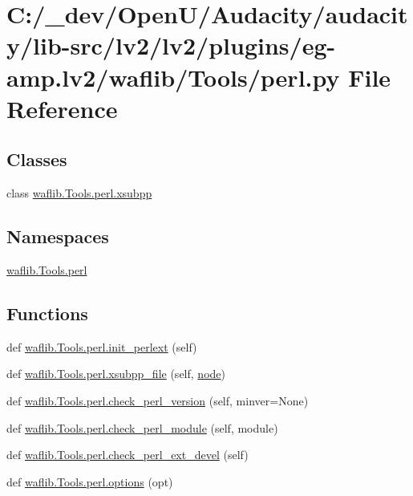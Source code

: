 \hypertarget{lv2_2plugins_2eg-amp_8lv2_2waflib_2_tools_2perl_8py}{}\section{C\+:/\+\_\+dev/\+Open\+U/\+Audacity/audacity/lib-\/src/lv2/lv2/plugins/eg-\/amp.lv2/waflib/\+Tools/perl.py File Reference}
\label{lv2_2plugins_2eg-amp_8lv2_2waflib_2_tools_2perl_8py}
\subsection*{Classes}
\begin{DoxyCompactItemize}
\item 
class \hyperlink{classwaflib_1_1_tools_1_1perl_1_1xsubpp}{waflib.\+Tools.\+perl.\+xsubpp}
\end{DoxyCompactItemize}
\subsection*{Namespaces}
\begin{DoxyCompactItemize}
\item 
 \hyperlink{namespacewaflib_1_1_tools_1_1perl}{waflib.\+Tools.\+perl}
\end{DoxyCompactItemize}
\subsection*{Functions}
\begin{DoxyCompactItemize}
\item 
def \hyperlink{namespacewaflib_1_1_tools_1_1perl_ad690c9b4e0627683b8d8eb680a42daf8}{waflib.\+Tools.\+perl.\+init\+\_\+perlext} (self)
\item 
def \hyperlink{namespacewaflib_1_1_tools_1_1perl_ad98847198592a78a56515c15f095334e}{waflib.\+Tools.\+perl.\+xsubpp\+\_\+file} (self, \hyperlink{structnode}{node})
\item 
def \hyperlink{namespacewaflib_1_1_tools_1_1perl_ac466c27b926b7d70a6643f8d055f62f6}{waflib.\+Tools.\+perl.\+check\+\_\+perl\+\_\+version} (self, minver=None)
\item 
def \hyperlink{namespacewaflib_1_1_tools_1_1perl_a96349a7aa3669ed96474a23459e98246}{waflib.\+Tools.\+perl.\+check\+\_\+perl\+\_\+module} (self, module)
\item 
def \hyperlink{namespacewaflib_1_1_tools_1_1perl_ae2effbe87451eba35dd7aa8cfa8d6b1a}{waflib.\+Tools.\+perl.\+check\+\_\+perl\+\_\+ext\+\_\+devel} (self)
\item 
def \hyperlink{namespacewaflib_1_1_tools_1_1perl_af58a6392e1e27cd335c892a619206093}{waflib.\+Tools.\+perl.\+options} (opt)
\end{DoxyCompactItemize}
